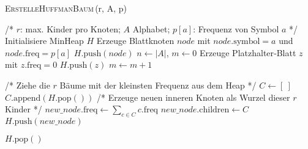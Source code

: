 \documentclass[a4paper,10pt,ngerman]{scrartcl}
\begin{document}
    \begin{algorithm} [H]
        \caption{\textsc{ErstelleHuffmanBaum}\,(r, A, p)}
        \label{alg:huffman-r-ary}
        \begin{algorithmic}[1]
                \State /* $r$: max. Kinder pro Knoten; $A$ Alphabet; $p[a]$: Frequenz von Symbol $a$ */
                \State Initialisiere MinHeap $H$
                    \State Erzeuge Blattknoten $node$ mit $node.\text{symbol}\!=\!a$ und $node.\text{freq}\!=\!p[a]$
                    \State $H.\text{push}(node)$
                \EndFor
                \State $n \gets |A|$, \quad $m \gets 0$
                    \State Erzeuge Platzhalter‐Blatt $z$ mit $z.\text{freq}=0$
                    \State $H.\text{push}(z)$
                    \State $m \gets m + 1$
                \EndWhile

                    \State /* Ziehe die $r$ Bäume mit der kleinsten Frequenz aus dem Heap */
                    \State $C \gets [\ ]$
                        \State $C.\text{append}(H.\text{pop}())$
                    \EndFor
                    \State /* Erzeuge neuen inneren Knoten als Wurzel dieser $r$ Kinder */
                    \State $new\_node.\text{freq} \gets \sum_{c \in C} c.\text{freq}$
                    \State $new\_node.\text{children} \gets C$
                    \State $H.\text{push}(new\_node)$
                \EndWhile

                \State \Return $H.\text{pop}()$  
            \EndFunction
        \end{algorithmic}
    \end{algorithm}
\end{document}
